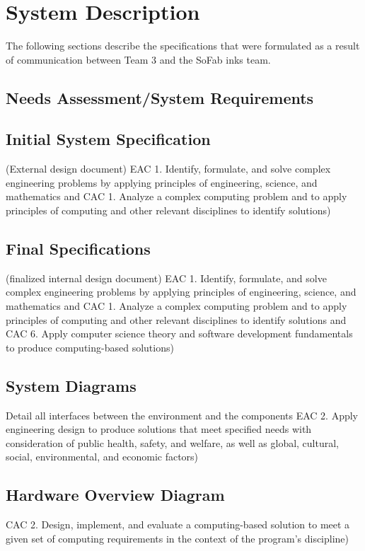 \documentclass{article}
\begin{document}
\section{System Description}
The following sections describe the specifications that were formulated as a result of communication between Team 3 and the SoFab inks
team. 
\subsection{Needs Assessment\slash System Requirements}

\subsection{Initial System Specification}
(External design document) 
    EAC 1. Identify, formulate, and solve complex engineering problems by 
    applying principles of engineering, science, and mathematics and CAC 1. 
    Analyze a complex computing problem and to apply principles of computing 
    and other relevant disciplines to identify solutions) 

\subsection{Final Specifications}
(finalized internal design document) 
    EAC 1. Identify, formulate, and solve complex engineering problems by 
    applying principles of engineering, science, and mathematics and CAC 1. 
    Analyze a complex computing problem and to apply principles of computing 
    and other relevant disciplines to identify solutions and CAC 6. Apply 
    computer science theory and software development fundamentals to produce 
    computing-based solutions) 

\subsection{System Diagrams} 
Detail all interfaces between the environment and the components 
    EAC 2. Apply engineering design to produce solutions that meet specified 
    needs with consideration of public health, safety, and welfare, as well as 
    global, cultural, social, environmental, and economic factors) 

\subsection{Hardware Overview Diagram} 
CAC 2. Design, implement, and evaluate a 
    computing-based solution to meet a given set of computing requirements in 
    the context of the program’s discipline) 
\end{document}
